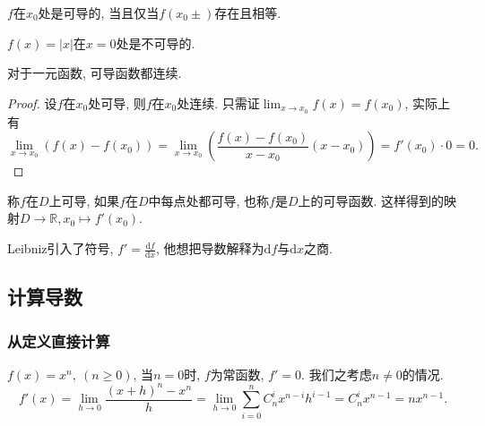 \begin{proposition}
    $f$在$x_0$处是可导的, 当且仅当$f\left( x_0 \pm  \right) $存在且相等.
\end{proposition}

\begin{example}
    $f\left( x \right) = \left| x \right| $在$x=0$处是不可导的.
\end{example}

\begin{proposition}
    对于一元函数, 可导函数都连续.
\end{proposition}
\begin{proof}
    设$f$在$x_0$处可导, 则$f$在$x_0$处连续.
    只需证$\lim_{x \to x_0} f\left( x \right) = f\left( x_0 \right) $, 实际上有
    \begin{equation}
        \lim_{x \to x_0} \left( f\left( x \right) - f\left( x_0 \right)  \right) = \lim_{x \to x_0} \left( \frac{f\left( x \right) - f\left( x_0 \right) }{x-x_0} \left( x - x_0 \right)  \right) = f'\left( x_0 \right) \cdot 0 = 0.
    \end{equation}
\end{proof}

\begin{definition}
    称$f$在$D$上可导, 如果$f$在$D$中每点处都可导, 也称$f$是$D$上的可导函数.
    这样得到的映射$D \to \mathbb{R}, x_0\mapsto f'\left( x_0 \right) $.
\end{definition}

Leibniz引入了符号, $f' = \frac{\mathrm{d}f}{\mathrm{d} x}$, 他想把导数解释为$\mathrm{d}f$与$\mathrm{d}x$之商.

\subsection{计算导数}
\subsubsection{从定义直接计算}
\begin{example}
    $f\left( x \right) = x^{n} ,\ (n\ge 0)$, 当$n=0$时, $f$为常函数, $f' = 0$. 我们之考虑$n \neq 0$的情况.
    \begin{equation}
        f'\left( x \right) = \lim_{h \to 0} \frac{\left( x+h \right) ^{n} - x^{n}}{h} = \lim_{h \to 0} \sum_{i=0}^{n} C_{n}^{i} x^{n-i} h^{i-1}= C_{n}^{i} x^{n-1} = n x^{n-1}.
    \end{equation}
\end{example}

